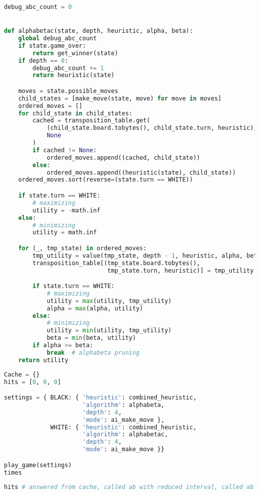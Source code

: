 \begin{lstlisting}[language=Python]
debug_abc_count = 0


def alphabetac(state, depth, heuristic, alpha, beta):
    global debug_abc_count
    if state.game_over:
        return get_winner(state)
    if depth == 0:
        debug_abc_count += 1
        return heuristic(state)

    moves = state.possible_moves
    child_states = [make_move(state, move) for move in moves]
    ordered_moves = []
    for child_state in child_states:
        cached = transposition_table.get(
            (child_state.board.tobytes(), child_state.turn, heuristic),
            None
        )
        if cached != None:
            ordered_moves.append((cached, child_state))
        else:
            ordered_moves.append((heuristic(state), child_state))
    ordered_moves.sort(reverse=(state.turn == WHITE))

    if state.turn == WHITE:
        # maximizing
        utility = -math.inf
    else:
        # minimizing
        utility = math.inf

    for (_, tmp_state) in ordered_moves:
        tmp_utility = value(tmp_state, depth - 1, heuristic, alpha, beta)
        transposition_table[(tmp_state.board.tobytes(),
                             tmp_state.turn, heuristic)] = tmp_utility

        if state.turn == WHITE:
            # maximizing
            utility = max(utility, tmp_utility)
            alpha = max(alpha, utility)
        else:
            # minimizing
            utility = min(utility, tmp_utility)
            beta = min(beta, utility)
        if alpha >= beta:
            break  # alphabeta pruning
    return utility
\end{lstlisting}

\begin{lstlisting}[language=Python]
Cache = {}
hits = [0, 0, 0]

settings = { BLACK: { 'heuristic': combined_heuristic,
                      'algorithm': alphabeta,
                      'depth': 4,
                      'mode': ai_make_move },
             WHITE: { 'heuristic': combined_heuristic,
                      'algorithm': alphabetac,
                      'depth': 4,
                      'mode': ai_make_move }}

play_game(settings)
times
\end{lstlisting}

\begin{lstlisting}[language=Python]
hits # answered from cache, called ab with reduced interval, called ab normal
\end{lstlisting}

